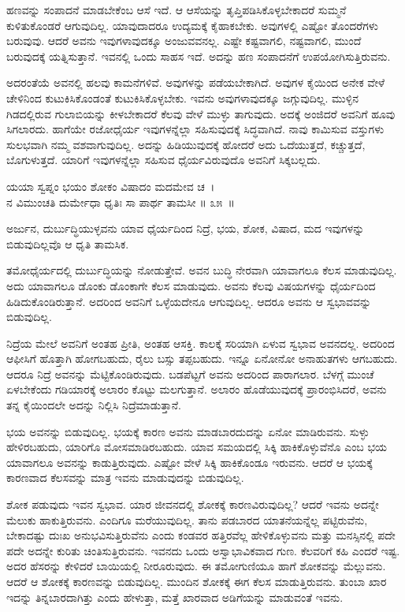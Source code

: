 ಹಣವನ್ನು ಸಂಪಾದನೆ ಮಾಡಬೇಕೆಂಬ ಆಸೆ ಇದೆ. ಆ ಆಸೆಯನ್ನು ತೃಪ್ತಿಪಡಿಸಿಕೊಳ್ಳಬೇಕಾದರೆ ಸುಮ್ಮನೆ ಕುಳಿತುಕೊಂಡರೆ ಆಗುವುದಿಲ್ಲ. ಯಾವುದಾದರೂ ಉದ್ಯಮಕ್ಕೆ ಕೈಹಾಕಬೇಕು. ಅವುಗಳಲ್ಲಿ ಎಷ್ಟೋ ತೊಂದರೆಗಳು ಬರುವುವು. ಆದರೆ ಅವನು ಇವುಗಳಾವುದಕ್ಕೂ ಅಂಜುವವನಲ್ಲ. ಎಷ್ಟೇ ಕಷ್ಟವಾಗಲಿ, ನಷ್ಟವಾಗಲಿ, ಮುಂದೆ ಬರುವುದಕ್ಕೆ ಯತ್ನಿಸುತ್ತಾನೆ. ಇವನಲ್ಲಿ ಒಂದು ಸಾಹಸ ಇದೆ. ಅದನ್ನು ಹಣ ಸಂಪಾದನೆಗೆ ಉಪಯೋಗಿಸುತ್ತಿರುವನು.

ಅದರಂತೆಯೆ ಅವನಲ್ಲಿ ಹಲವು ಕಾಮನೆಗಳಿವೆ. ಅವುಗಳನ್ನು ಪಡೆಯಬೇಕಾಗಿದೆ. ಅವುಗಳ ಕೈಯಿಂದ ಅನೇಕ ವೇಳೆ ಚೇಳಿನಿಂದ ಕುಟುಕಿಸಿಕೊಂಡಂತೆ ಕುಟುಕಿಸಿಕೊಳ್ಳಬೇಕು. ಇವನು ಅವುಗಳಾವುದಕ್ಕೂ ಜಗ್ಗುವುದಿಲ್ಲ. ಮುಳ್ಳಿನ ಗಿಡದಲ್ಲಿರುವ ಗುಲಾಬಿಯನ್ನು ಕೀಳಬೇಕಾದರೆ ಕೆಲವು ವೇಳೆ ಮುಳ್ಳು ತಾಗುವುದು. ಅದಕ್ಕೆ ಅಂಜಿದರೆ ಅವನಿಗೆ ಹೂವು ಸಿಗಲಾರದು. ಹಾಗೆಯೇ ರಜೋಧೈರ್ಯ ಇವುಗಳನ್ನೆಲ್ಲಾ ಸಹಿಸುವುದಕ್ಕೆ ಸಿದ್ಧವಾಗಿದೆ. ನಾವು ಕಾಮಿಸುವ ವಸ್ತುಗಳು ಸುಲಭವಾಗಿ ನಮ್ಮ ವಶವಾಗುವುದಿಲ್ಲ. ಅದನ್ನು ಹಿಡಿಯುವುದಕ್ಕೆ ಹೋದರೆ ಅದು ಒದೆಯುತ್ತದೆ, ಕಚ್ಚುತ್ತದೆ, ಬೊಗುಳುತ್ತದೆ. ಯಾರಿಗೆ ಇವುಗಳನ್ನೆಲ್ಲಾ ಸಹಿಸುವ ಧೈರ್ಯವಿರುವುದೊ ಅವನಿಗೆ ಸಿಕ್ಕಬಲ್ಲದು.

\begin{shloka}
ಯಯಾ ಸ್ವಪ್ನಂ ಭಯಂ ಶೋಕಂ ವಿಷಾದಂ ಮದಮೇವ ಚ~।\\ನ ವಿಮುಂಚತಿ ದುರ್ಮೇಧಾ ಧೃತಿಃ ಸಾ ಪಾರ್ಥ ತಾಮಸೀ \hfill॥ ೩೫~॥
\end{shloka}

\begin{artha}
ಅರ್ಜುನ, ದುರ್ಬುದ್ಧಿಯುಳ್ಳವನು ಯಾವ ಧೈರ್ಯದಿಂದ ನಿದ್ರೆ, ಭಯ, ಶೋಕ, ವಿಷಾದ, ಮದ ಇವುಗಳನ್ನು ಬಿಡುವುದಿಲ್ಲವೊ ಆ ಧೃತಿ ತಾಮಸಿಕ.
\end{artha}

ತಮೋಧೈರ್ಯದಲ್ಲಿ ದುರ್ಬುದ್ಧಿಯನ್ನು ನೋಡುತ್ತೇವೆ. ಅವನ ಬುದ್ಧಿ ನೇರವಾಗಿ ಯಾವಾ\-ಗಲೂ ಕೆಲಸ ಮಾಡುವುದಿಲ್ಲ. ಅದು ಯಾವಾಗಲೂ ಡೊಂಕು ಡೊಂಕಾಗೇ ಕೆಲಸ ಮಾಡುವುದು. ಅವನು ಕೆಲವು ವಿಷಯಗಳನ್ನು ಧೈರ್ಯದಿಂದ ಹಿಡಿದುಕೊಂಡಿರುತ್ತಾನೆ. ಅದರಿಂದ ಅವನಿಗೆ ಒಳ್ಳೆಯದೇನೂ ಆಗುವುದಿಲ್ಲ. ಆದರೂ ಅವನು ಆ ಸ್ವಭಾವವನ್ನು ಬಿಡುವುದಿಲ್ಲ.

ನಿದ್ರೆಯ ಮೇಲೆ ಅವನಿಗೆ ಅಂತಹ ಪ್ರೀತಿ, ಅಂತಹ ಆಸಕ್ತಿ. ಕಾಲಕ್ಕೆ ಸರಿಯಾಗಿ ಏಳುವ ಸ್ವಭಾವ ಅವನದಲ್ಲ. ಅದರಿಂದ ಆಫೀಸಿಗೆ ಹೊತ್ತಾಗಿ ಹೋಗಬಹುದು, ರೈಲು ಬಸ್ಸು ತಪ್ಪಬಹುದು. ಇನ್ನೂ ಏನೋನೋ ಅನಾಹುತಗಳು ಆಗಬಹುದು. ಆದರೂ ನಿದ್ರೆ ಅವನನ್ನು ಮೆಟ್ಟಿಕೊಂಡಿರುವುದು. ಬಡಪೆಟ್ಟಗೆ ಅವನು ಅದರಿಂದ ಪಾರಾಗಲಾರ. ಬೆಳಗ್ಗೆ ಮುಂಚೆ ಏಳಬೇಕೆಂದು ಗಡಿಯಾರಕ್ಕೆ ಅಲಾರಂ ಕೊಟ್ಟು ಮಲಗುತ್ತಾನೆ. ಅಲಾರಂ ಹೊಡೆಯುವುದಕ್ಕೆ ಪ್ರಾರಂಭಿಸಿದರೆ, ಅವನು ತನ್ನ ಕೈಯಿಂದಲೇ ಅದನ್ನು ನಿಲ್ಲಿಸಿ ನಿದ್ರೆಮಾಡುತ್ತಾನೆ.

ಭಯ ಅವನನ್ನು ಬಿಡುವುದಿಲ್ಲ. ಭಯಕ್ಕೆ ಕಾರಣ ಅವನು ಮಾಡಬಾರದುದನ್ನು ಏನೋ ಮಾಡಿರುವನು. ಸುಳ್ಳು ಹೇಳಿರಬಹುದು, ಯಾರಿಗೊ ಮೋಸಮಾಡಿರಬಹುದು. ಯಾವ ಸಮಯದಲ್ಲಿ ಸಿಕ್ಕಿ ಹಾಕಿಕೊಳ್ಳುವೆನೊ ಎಂಬ ಭಯ ಯಾವಾಗಲೂ ಅವನನ್ನು ಕಾಡುತ್ತಿರುವುದು. ಎಷ್ಟೋ ವೇಳೆ ಸಿಕ್ಕಿ ಹಾಕಿಕೊಂಡೂ ಇರುವನು. ಆದರೆ ಆ ಭಯಕ್ಕೆ ಕಾರಣವಾದ ಕೆಲಸವನ್ನು ಮಾತ್ರ ಇವನು ಮಾಡುವುದನ್ನು ಬಿಡುವುದಿಲ್ಲ.

ಶೋಕ ಪಡುವುದು ಇವನ ಸ್ವಭಾವ. ಯಾರ ಜೀವನದಲ್ಲಿ ಶೋಕಕ್ಕೆ ಕಾರಣವಿರುವುದಿಲ್ಲ? ಆದರೆ ಇವನು ಅದನ್ನೇ ಮೆಲುಕು ಹಾಕುತ್ತಿರುವನು. ಎಂದಿಗೂ ಮರೆಯುವುದಿಲ್ಲ. ತಾನು ಪಡಬಾರದ ಯಾತನೆಯನ್ನೆಲ್ಲ ಪಟ್ಟಿರುವೆನು, ಬೇಕಾದಷ್ಟು ದುಃಖ ಅನುಭವಿಸುತ್ತಿರುವೆನು ಎಂದು ಕಂಡವರ ಹತ್ತಿರವೆಲ್ಲ ಹೇಳಿಕೊಳ್ಳುವನು ಮತ್ತು ಮನಸ್ಸಿನಲ್ಲಿ ಪದೇ ಪದೇ ಅದನ್ನೇ ಕುರಿತು ಚಿಂತಿಸುತ್ತಿರುವನು. ಇವನದು ಒಂದು ಅಸ್ವಾಭಾವಿಕವಾದ ಗುಣ. ಕೆಲವರಿಗೆ ಕಹಿ ಎಂದರೆ ಇಷ್ಟ. ಅದರ ಹೆಸರನ್ನು ಕೇಳಿದರೆ ಬಾಯಿಯಲ್ಲಿ ನೀರೂರುವುದು. ಈ ತಮೋಗುಣಿಯೂ ಹಾಗೆ ಶೋಕವನ್ನು ಮೆಲ್ಲುವನು. ಆದರೆ ಆ ಶೋಕಕ್ಕೆ ಕಾರಣವನ್ನು ಬಿಡುವುದಿಲ್ಲ. ಮುಂದಿನ ಶೋಕಕ್ಕೆ ಈಗ ಕೆಲಸ ಮಾಡುತ್ತಿರುವನು. ತುಂಬಾ ಖಾರ ಇದನ್ನು ತಿನ್ನಬಾರದಾಗಿತ್ತು ಎಂದು ಹೇಳುತ್ತಾ, ಮತ್ತೆ ಖಾರವಾದ ಅಡಿಗೆಯನ್ನು ಮಾಡುವಂತೆ ಇವನು.

